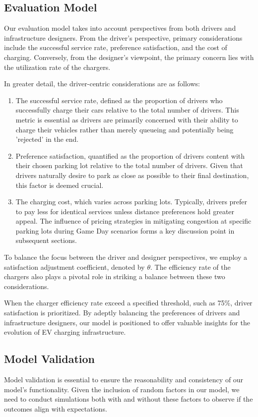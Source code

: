 \subsection{Evaluation Model}
Our evaluation model takes into account perspectives from both drivers and infrastructure designers. From the driver's perspective, primary considerations include the successful service rate, preference satisfaction, and the cost of charging. Conversely, from the designer's viewpoint, the primary concern lies with the utilization rate of the chargers.

In greater detail, the driver-centric considerations are as follows:
\begin{enumerate}
    \item The successful service rate, defined as the proportion of drivers who successfully charge their cars relative to the total number of drivers. This metric is essential as drivers are primarily concerned with their ability to charge their vehicles rather than merely queueing and potentially being 'rejected' in the end.

    \item Preference satisfaction, quantified as the proportion of drivers content with their chosen parking lot relative to the total number of drivers. Given that drivers naturally desire to park as close as possible to their final destination, this factor is deemed crucial.

    \item The charging cost, which varies across parking lots. Typically, drivers prefer to pay less for identical services unless distance preferences hold greater appeal. The influence of pricing strategies in mitigating congestion at specific parking lots during Game Day scenarios forms a key discussion point in subsequent sections.
\end{enumerate}

To balance the focus between the driver and designer perspectives, we employ a satisfaction adjustment coefficient, denoted by $\theta$. The efficiency rate of the chargers also plays a pivotal role in striking a balance between these two considerations.

When the charger efficiency rate exceed a specified threshold, such as 75\%, driver satisfaction is prioritized. By adeptly balancing the preferences of drivers and infrastructure designers, our model is positioned to offer valuable insights for the evolution of EV charging infrastructure.

\subsection{Model Validation}
Model validation is essential to ensure the reasonability and consistency of our model's functionality. Given the inclusion of random factors in our model, we need to conduct simulations both with and without these factors to observe if the outcomes align with expectations.

